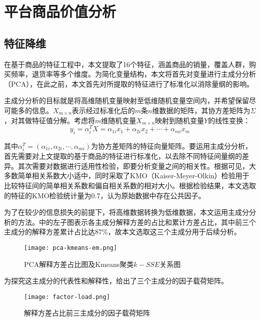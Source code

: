 \documentclass[lang=cn,11pt,a4paper,cite=authoryear]{elegantpaper}
\begin{document}
\section{平台商品价值分析}

\subsection{特征降维}

在基于商品的特征工程中，本文提取了16个特征，涵盖商品的销量，覆盖人群，购买频率，退货率等多个维度。为简化变量结构，本文将首先对变量进行主成分分析（PCA），在此之前，本文首先对所提取的特征进行了标准化以消除量纲的影响。

主成分分析的目标就是将高维随机变量映射至低维随机变量空间内，并希望保留尽可能多的信息。$X_{m \times n}$表示经过标准化后的$m$条$n$维数据的矩阵，其协方差矩阵为$\Sigma$，对其做特征值分解。考虑将$m$维随机变量$X_{m \times n}$映射到随机变量$Y$的线性变换：
\begin{equation}
  y_i = \alpha_{i}^T X = \alpha_{1i}x_1 +\alpha_{2i} x_2 + \cdots + \alpha_{mi} x_m
\end{equation}

其中$\alpha_i^T = (\alpha_{1i}, \alpha_{2i}, \cdots, \alpha_{mi})$为协方差矩阵的特征向量矩阵。要运用主成分分析，首先需要对上文提取的基于商品的特征进行标准化，以去除不同特征间量纲的差异。其次需要对数据进行适用性检验，即要分析变量之间的相关性。根据可见，大多数简单相关系数大小适中，同时采取了KMO（Kaiser-Meyer-Olkin）检验用于比较特征间的简单相关系数和偏自相关系数的相对大小。根据检验结果，本文选取的特征的KMO检验统计量为0.7，认为原始数据中存在公共因子。

为了在较少的信息损失的前提下，将高维数据转换为低维数据，本文运用主成分分析的方法。中的左子图表示各主成分解释方差的占比和累计方差占比，其中前三个主成分的解释方差累计占比达87\%，故本文选取这三个主成分用于后续分析。
\begin{figure}[H]
  \centering
  \texttt{[image: pca-kmeans-em.png]}
  \caption{PCA解释方差占比图及Kmeans聚类$k-SSE$关系图}
  \label{主成分聚类}
\end{figure}

为探究这主成分的代表性和解释性，给出了三个主成分的因子载荷矩阵。
\begin{figure}[H]
  \centering
  \texttt{[image: factor-load.png]}
  \caption{解释方差占比前三主成分的因子载荷矩阵}
  \label{因子载荷矩阵}
\end{figure}
\end{document}
